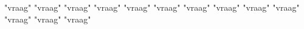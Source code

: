 \documentclass[12pt, a4paper]{article}
\begin{document}
	
	{"vraag"}
	{"vraag"}
	{"vraag"}
	{"vraag"}
	{"vraag"}
	{"vraag"}
	{"vraag"}
	{"vraag"}
	{"vraag"}
	{"vraag"}
	{"vraag"}
	{"vraag"}
	{"vraag"}
\end{document}
